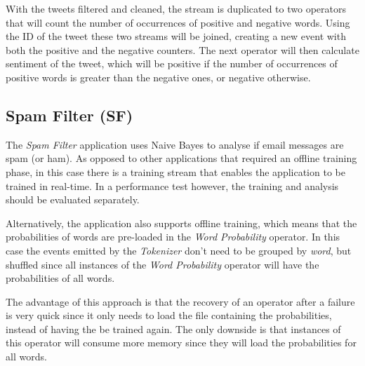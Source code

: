 \documentclass[ppgc,diss,english]{iiufrgs}
\begin{document}
With the tweets filtered and cleaned, the stream is duplicated to two operators that will count the number of occurrences of positive and negative words. Using the ID of the tweet these two streams will be joined, creating a new event with both the positive and the negative counters. The next operator will then calculate sentiment of the tweet, which will be positive if the number of occurrences of positive words is greater than the negative ones, or negative otherwise.


\subsection{Spam Filter (SF)}

The \emph{Spam Filter} application uses Naive Bayes \cite{androutsopoulos2000evaluation} to analyse if email messages are spam (or ham). As opposed to other applications that required an offline training phase, in this case there is a training stream that enables the application to be trained in real-time. In a performance test however, the training and analysis should be evaluated separately.

Alternatively, the application also supports offline training, which means that the probabilities of words are pre-loaded in the \emph{Word Probability} operator. In this case the events emitted by the \emph{Tokenizer} don't need to be grouped by \emph{word}, but shuffled since all instances of the \emph{Word Probability} operator will have the probabilities of all words.

The advantage of this approach is that the recovery of an operator after a failure is very quick since it only needs to load the file containing the probabilities, instead of having the be trained again. The only downside is that instances of this operator will consume more memory since they will load the probabilities for all words.
\end{document}
